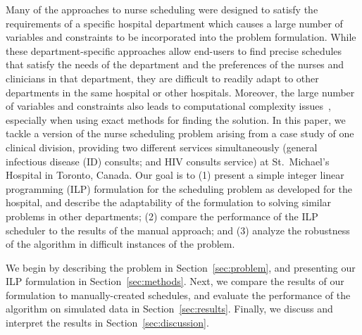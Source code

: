 
Many of the approaches to nurse scheduling were designed to satisfy the
requirements of a specific hospital department which causes a large number of
variables and constraints to be incorporated into the problem formulation. While
these department-specific approaches allow end-users to find precise schedules
that satisfy the needs of the department and the preferences of the nurses and
clinicians in that department, they are difficult to readily adapt to other
departments in the same hospital or other hospitals. %
Moreover, the large number of variables and constraints also leads to
computational complexity issues~\cite{goos_complexity_1996}, especially when
using exact methods for finding the solution. In this paper, we tackle a version
of the nurse scheduling problem arising from a case study of one clinical
division, providing two different services simultaneously (general infectious
disease (ID) consults; and HIV consults service) at St.\ Michael's Hospital in
Toronto, Canada. Our goal is to (1) present a simple integer linear programming
(ILP) formulation for the scheduling problem as developed for the hospital, and
describe the adaptability of the formulation to solving similar problems in
other departments; (2) compare the performance of the ILP scheduler to the
results of the manual approach; and (3) analyze the robustness of the algorithm
in difficult instances of the problem.

We begin by describing the problem in Section~\ref{sec:problem}, and presenting
our ILP formulation in Section~\ref{sec:methods}. Next, we compare the results
of our formulation to manually-created schedules, and evaluate the performance
of the algorithm on simulated data in Section~\ref{sec:results}. Finally, we
discuss and interpret the results in Section~\ref{sec:discussion}. %
